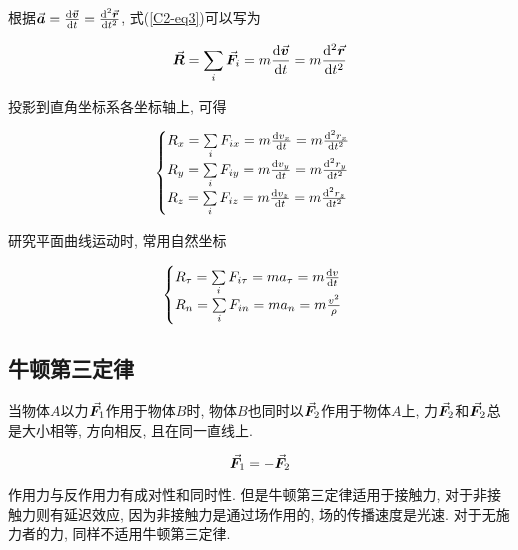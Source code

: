 根据$\va*{a} = \dv{\va*{v}}{t} = \dv[2]{\va*{r}}{t}$, 式(\ref{C2-eq3})可以写为

\begin{equation}
	\va*{R} = \sum\limits_i \va*{F}_i = m \dv{\va*{v}}{t} = m \dv[2]{\va*{r}}{t}
	\label{C2-eq4}
\end{equation}

\newpage

投影到直角坐标系各坐标轴上, 可得

\begin{equation}
	\begin{cases}
		R_x = \sum\limits_i F_{ix} = m \dv{v_x}{t} = m \dv[2]{r_x}{t} \\
		R_y = \sum\limits_i F_{iy} = m \dv{v_y}{t} = m \dv[2]{r_y}{t} \\
		R_z = \sum\limits_i F_{iz} = m \dv{v_z}{t} = m \dv[2]{r_z}{t} 
	\end{cases}
    \label{C2-eq5}
\end{equation}

研究平面曲线运动时, 常用自然坐标

\begin{equation}
	\begin{cases}
		R_{\tau} = \sum\limits_i F_{i\tau} = m a_{\tau} = m \dv{v}{t} \\
		R_{n} = \sum\limits_i F_{in} = m a_{n} = m \frac{v^2}{\rho} 
	\end{cases}
    \label{C2-eq6}
\end{equation}

\subsection{牛顿第三定律}

\begin{axiom}[牛顿第三定律] \label{C2-ax3}
	当物体$A$以力$\va*{F}_1$作用于物体$B$时, 物体$B$也同时以$\va*{F}_2$作用于物体$A$上, 力$\va*{F}_2$和$\va*{F}_2$总是大小相等, 方向相反, 且在同一直线上. 
	
	\begin{equation}
		\va*{F}_1 = -\va*{F}_2 \label{C2-eq7}
	\end{equation}
	
\end{axiom}

\begin{note}
	
	作用力与反作用力有成对性和同时性. 但是牛顿第三定律适用于接触力, 对于非接触力则有延迟效应, 因为非接触力是通过场作用的, 场的传播速度是光速. 对于无施力者的力, 同样不适用牛顿第三定律. 
	
\end{note}

